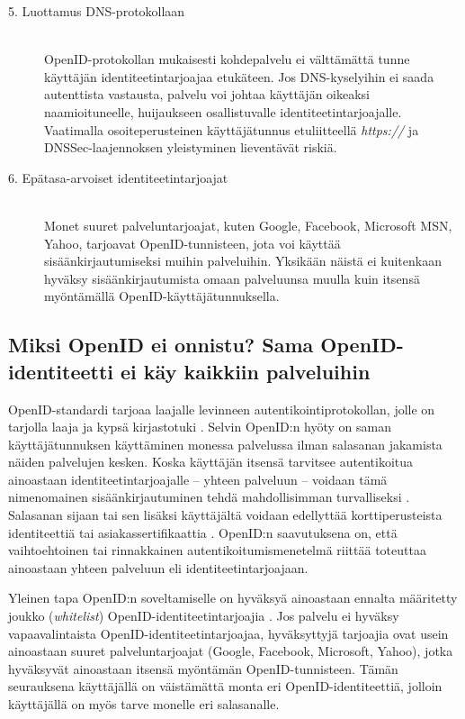 \documentclass[english,gradu]{tktltiki}
\begin{document}
\begin{description}
  \item[5. Luottamus DNS-protokollaan] \hfill \\
    OpenID-protokollan mukaisesti kohdepalvelu ei välttämättä tunne käyttäjän identiteetintarjoajaa etukäteen.
    Jos DNS-kyselyihin ei saada autenttista vastausta, palvelu voi johtaa käyttäjän oikeaksi naamioituneelle,
    huijaukseen osallistuvalle identiteetintarjoajalle. Vaatimalla osoiteperusteinen käyttäjätunnus
    etuliitteellä \emph{https://} ja DNSSec-laajennoksen yleistyminen lieventävät riskiä.

   \item[6. Epätasa-arvoiset identiteetintarjoajat] \hfill \\
      Monet suuret palveluntarjoajat, kuten Google, Facebook, Microsoft MSN, Yahoo, tarjoavat OpenID-tunnisteen,
      jota voi käyttää sisäänkirjautumiseksi muihin palveluihin. Yksikään näistä ei kuitenkaan hyväksy
      sisäänkirjautumista omaan palveluunsa muulla kuin itsensä myöntämällä OpenID-käyttäjätunnuksella.

    \end{description}


\subsection{Miksi OpenID ei onnistu? Sama OpenID-identiteetti ei käy kaikkiin palveluihin} %
\label{sub:sama_openid_identiteetti_ei_käy_kaikkiin_palveluihin}

OpenID-standardi tarjoaa laajalle levinneen autentikointiprotokollan, jolle on tarjolla laaja ja kypsä kirjastotuki \cite{openid_libraries}. Selvin OpenID:n hyöty on saman käyttäjätunnuksen käyttäminen monessa palvelussa ilman salasanan jakamista näiden palvelujen kesken. Koska käyttäjän itsensä tarvitsee autentikoitua ainoastaan identiteetintarjoajalle -- yhteen palveluun -- voidaan tämä nimenomainen sisäänkirjautuminen tehdä mahdollisimman turvalliseksi \cite{blackhat_openid_security_story}. Salasanan sijaan tai sen lisäksi käyttäjältä voidaan edellyttää korttiperusteista identiteettiä \cite{cameron_infocard_07} tai asiakassertifikaattia \cite{henry_story_foaf_ssl}. OpenID:n saavutuksena on, että vaihtoehtoinen tai rinnakkainen autentikoitumismenetelmä riittää toteuttaa ainoastaan yhteen palveluun eli identiteetintarjoajaan.

Yleinen tapa OpenID:n soveltamiselle on hyväksyä ainoastaan ennalta määritetty joukko (\emph{whitelist})
OpenID-identiteetintarjoajia \cite{openid_seven_sites_mailinglist, openid_tech_or_movement}. Jos palvelu ei
hyväksy vapaavalintaista OpenID-identiteetintarjoajaa, hyväksyttyjä tarjoajia ovat usein ainoastaan suuret
palveluntarjoajat (Google, Facebook, Microsoft, Yahoo), jotka hyväksyvät ainoastaan itsensä myöntämän
OpenID-tunnisteen. Tämän seurauksena käyttäjällä on väistämättä monta eri OpenID-identiteettiä, jolloin
käyttäjällä on myös tarve monelle eri salasanalle.
\end{document}
